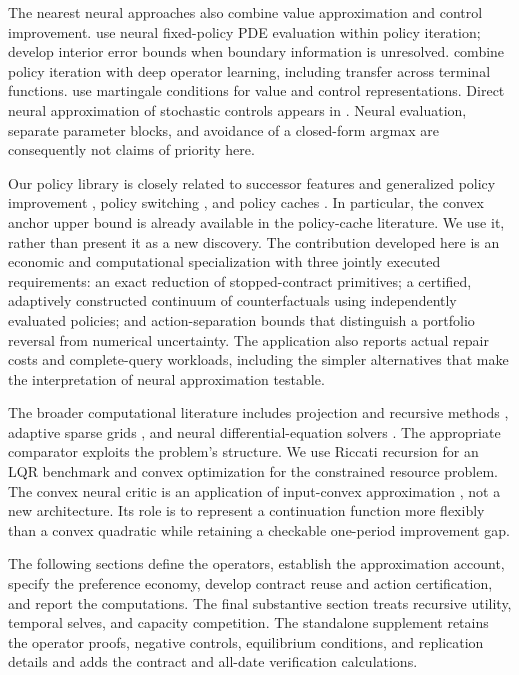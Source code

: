 The nearest neural approaches also combine value approximation and control improvement. \citet{kim2025} use neural fixed-policy PDE evaluation within policy iteration; \citet{kim2026} develop interior error bounds when boundary information is unresolved. \citet{lee2024} combine policy iteration with deep operator learning, including transfer across terminal functions. \citet{cai2025} use martingale conditions for value and control representations. Direct neural approximation of stochastic controls appears in \citet{han2016}. Neural evaluation, separate parameter blocks, and avoidance of a closed-form argmax are consequently not claims of priority here.

Our policy library is closely related to successor features and generalized policy improvement \citep{barreto2017}, policy switching \citep{chang2021}, and policy caches \citep{nemecek2021}. In particular, the convex anchor upper bound is already available in the policy-cache literature. We use it, rather than present it as a new discovery. The contribution developed here is an economic and computational specialization with three jointly executed requirements: an exact reduction of stopped-contract primitives; a certified, adaptively constructed continuum of counterfactuals using independently evaluated policies; and action-separation bounds that distinguish a portfolio reversal from numerical uncertainty. The application also reports actual repair costs and complete-query workloads, including the simpler alternatives that make the interpretation of neural approximation testable.

The broader computational literature includes projection and recursive methods \citep{judd1998,stokey1989}, adaptive sparse grids \citep{brumm2017}, and neural differential-equation solvers \citep{raissi2019,han2018}. The appropriate comparator exploits the problem's structure. We use Riccati recursion for an LQR benchmark and convex optimization for the constrained resource problem. The convex neural critic is an application of input-convex approximation \citep{amos2017}, not a new architecture. Its role is to represent a continuation function more flexibly than a convex quadratic while retaining a checkable one-period improvement gap.

The following sections define the operators, establish the approximation account, specify the preference economy, develop contract reuse and action certification, and report the computations. The final substantive section treats recursive utility, temporal selves, and capacity competition. The standalone supplement retains the operator proofs, negative controls, equilibrium conditions, and replication details and adds the contract and all-date verification calculations.
